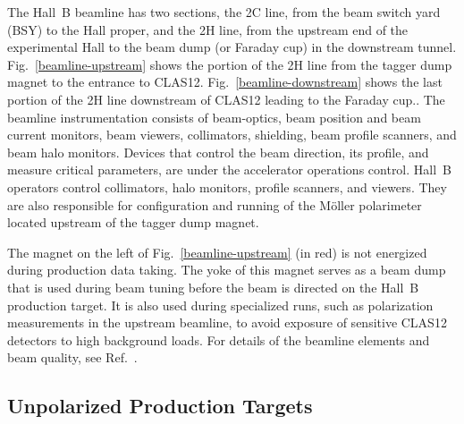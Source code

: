 \documentclass[final,3p,twocolumn]{elsarticle}
\begin{document}
The Hall~B beamline has two sections, the 2C line, from the beam switch yard (BSY) to the Hall proper, and the 2H
line, from the upstream end of the experimental Hall to the beam dump (or Faraday cup) in the downstream tunnel.
Fig.~\ref{beamline-upstream} shows the portion of the 2H line from the tagger dump magnet to the entrance to
CLAS12. Fig.~\ref{beamline-downstream} shows the last portion of the 2H line downstream of CLAS12 leading to
the Faraday cup.. The beamline instrumentation consists of beam-optics, beam position and beam current monitors,
beam viewers, collimators,  shielding, beam profile scanners, and beam halo monitors. Devices that control the beam
direction, its profile, and  measure critical parameters, are under the accelerator operations control. Hall~B operators
control collimators, halo monitors, profile scanners, and viewers. They are also responsible for configuration and
running of the M\"oller polarimeter located upstream of the tagger dump magnet.

The magnet on the left of Fig.~\ref{beamline-upstream} (in red) is not energized during production data taking. The
yoke of this magnet serves as a beam dump that is used during beam tuning before the beam is directed on the Hall~B
production target. It is also used during specialized runs, such as polarization measurements in the upstream beamline,
to avoid exposure of sensitive CLAS12 detectors to high background loads. For details of the beamline elements and
beam quality, see Ref.~\cite{beamline}.  
 
\subsection{Unpolarized Production Targets} 
\end{document}
